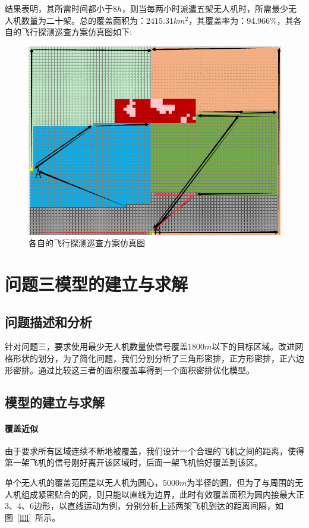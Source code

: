 \documentclass{whutmod}
\begin{document}
	结果表明，其所需时间都小于$8h$，则当每两小时派遣五架无人机时，所需最少无人机数量为二十架。总的覆盖面积为：$2415.31km^{2}$，其覆盖率为：94.966\%，其各自的飞行探测巡查方案仿真图如下:
	
		\begin{figure}[H]
		\centering
		\includegraphics[width=.7\textwidth]{figures/88.png}
		\caption{各自的飞行探测巡查方案仿真图}
	\end{figure}
	
	\section{问题三模型的建立与求解}
	
	
	\subsection{问题描述和分析}
	  针对问题三，要求使用最少无人机数量使信号覆盖$1800m$以下的目标区域。改进网格形状的划分，为了简化问题，我们分别分析了三角形密排，正方形密排，正六边形密排。通过比较这三者的面积覆盖率得到一个面积密排优化模型。
	
	\subsection{模型的建立与求解}
	
	\paragraph{覆盖近似}
	由于要求所有区域连续不断地被覆盖，我们设计一个合理的飞机之间的距离，使得第一架飞机的信号刚好离开该区域时，后面一架飞机恰好覆盖到该区。
	
	单个无人机的覆盖范围是以无人机为圆心，$5000m$为半径的圆，但为了与周围的无人机组成紧密贴合的网，则只能以直线为边界，此时有效覆盖面积为圆内接最大正3、4、6边形，以直线运动为例，分别分析上述两架飞机到达的距离间隔，如图~\ref{llll}~所示。
	
\end{document}
